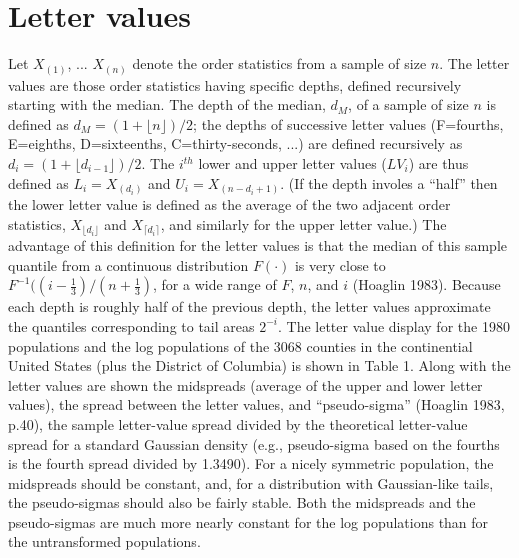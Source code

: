 \documentclass[11pt]{article}
\begin{document}
\section {Letter values}

Let $X_{(1)}$, ...  $X_{(n)}$ denote the order statistics
from a sample of size $n$.
The letter values are those order statistics having specific
depths, defined recursively starting with the median.
The depth of the median, $d_M$, of a sample of size $n$
is defined as $d_M = (1 + \lfloor n \rfloor)/2$; the depths
of successive letter values (F=fourths, E=eighths, 
D=sixteenths, C=thirty-seconds, ...) are defined recursively 
as $d_i = (1 + \lfloor d_{i-1} \rfloor)/2$.  
The $i^{th}$ lower and upper letter values ($LV_i$) are 
thus defined as $L_i = X_{(d_i)}$ and
$U_i = X_{(n-d_i+1)}$.
(If the depth involes a ``half'' then the lower letter 
value is defined as the average of the two adjacent order
statistics, $X_{\lfloor d_i \rfloor}$ and
$X_{\lceil d_i \rceil}$, and similarly for the upper
letter value.)
The advantage of this definition for the letter values
is that the median of this sample quantile from a
continuous distribution $F(\cdot)$ is very close to
$F^{-1} ((i - \frac{1}{3})/(n + \frac{1}{3})$, for a 
wide range of $F$, $n$, and $i$ (Hoaglin 1983).
Because each depth is roughly half of the previous depth,
the letter values approximate the quantiles corresponding
to tail areas $2^{-i}$.
The letter value display for the 1980 populations
and the log populations
of the 3068 counties in the continential United States
(plus the District of Columbia) is shown in Table 1.
Along with the letter values are shown the midspreads
(average of the upper and lower letter values), the
spread between the letter values, and ``pseudo-sigma''
(Hoaglin 1983, p.40), the sample letter-value spread 
divided by the theoretical
letter-value spread for a standard Gaussian
density (e.g., pseudo-sigma based on the fourths is 
the fourth spread divided by 1.3490).
For a nicely symmetric population, the midspreads should
be constant, and, for a distribution with Gaussian-like
tails, the pseudo-sigmas should also be fairly stable.
Both the midspreads and the pseudo-sigmas are much more
nearly constant for the log populations than for the
untransformed populations.
\end{document}
